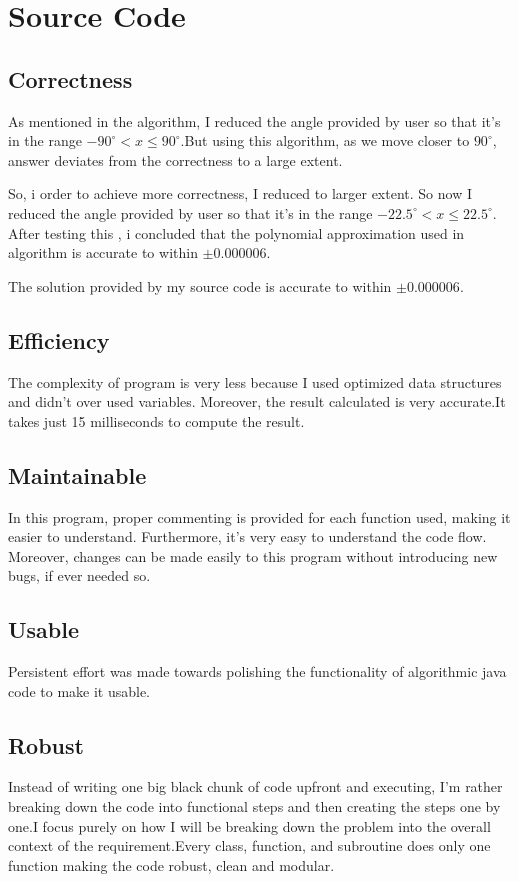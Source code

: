 \documentclass{article}
\begin{document}
\section{Source Code}
\subsection{Correctness}
As mentioned in the algorithm, I reduced the angle provided by user so that it's in the range \(-90^{\circ}<x\leq90^{\circ}\).But using this algorithm, as we move closer to $90^{\circ}$, answer deviates from the correctness to a large extent.
\begin{flushleft}
 So, i  order to achieve more correctness, I reduced to larger extent. So now I reduced the angle provided by user so that it's in the range   \(-22.5^{\circ}<x\leq22.5^{\circ}\). After testing this , i concluded that the polynomial approximation used in algorithm is accurate to within \(\pm0.000006\).
\end{flushleft}
\begin{flushleft}
 The solution provided by my source code is accurate to within \(\pm0.000006\).
\end{flushleft}
\subsection{Efficiency}
The complexity of program is very less because I used optimized data structures and didn't over used variables. Moreover, the result calculated is very accurate.It takes just 15 milliseconds to compute the result. 

\subsection{Maintainable}
In this program, proper commenting is provided for each function used, making it easier to understand. Furthermore, it's very easy to understand the code flow. Moreover, changes can be made easily to this program without introducing new bugs, if ever needed so.  
\subsection{Usable}
Persistent effort was made towards polishing the functionality of algorithmic java code to make it usable.
\subsection{Robust}
Instead of writing one big black chunk of code upfront and executing, I'm rather breaking down the code into functional steps and then creating the steps one by one.I focus purely on how I will be breaking down the problem into the overall context of the requirement.Every class, function, and subroutine does only one function making the code robust, clean and modular.
\pagebreak
\end{document}

